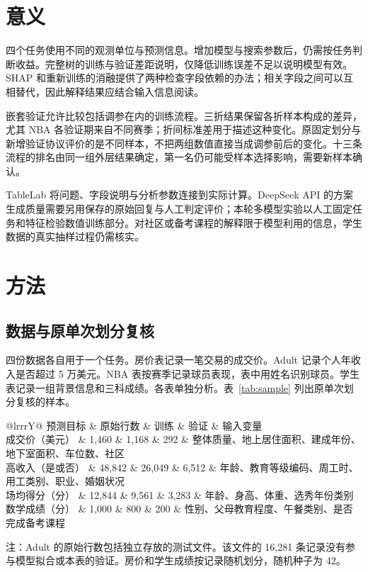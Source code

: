 \documentclass[12pt,journal,onecolumn,a4paper]{IEEEtran}
\newcommand{\tabnote}[1]{\par\vspace{2pt}\begin{minipage}{\linewidth}\footnotesize #1\end{minipage}}
\newcommand{\inlinetab}[1]{\par\smallskip\noindent\begin{minipage}{\linewidth}\centering\small #1\end{minipage}\par\smallskip}
\begin{document}
\section{意义}
四个任务使用不同的观测单位与预测信息。增加模型与搜索参数后，仍需按任务判断收益。完整树的训练与验证差距说明，仅降低训练误差不足以说明模型有效。SHAP 和重新训练的消融提供了两种检查字段依赖的办法；相关字段之间可以互相替代，因此解释结果应结合输入信息阅读。

嵌套验证允许比较包括调参在内的训练流程。三折结果保留各折样本构成的差异，尤其 NBA 各验证期来自不同赛季；折间标准差用于描述这种变化。原固定划分与新增验证协议评价的是不同样本，不把两组数值直接当成调参前后的变化。十三条流程的排名由同一组外层结果确定，第一名仍可能受样本选择影响，需要新样本确认。

TableLab 将问题、字段说明与分析参数连接到实际计算。DeepSeek API 的方案生成质量需要另用保存的原始回复与人工判定评价；本轮多模型实验以人工固定任务和特征检验数值训练部分。对社区或备考课程的解释限于模型利用的信息，学生数据的真实抽样过程仍需核实。

\section{方法}
\subsection{数据与原单次划分复核}
四份数据各自用于一个任务。房价表记录一笔交易的成交价。Adult 记录个人年收入是否超过 5 万美元。NBA 表按赛季记录球员表现，表中用姓名识别球员。学生表记录一组背景信息和三科成绩。各表单独分析。表~\ref{tab:sample} 列出原单次划分复核的样本。
\inlinetab{\label{tab:sample}
\begin{tabularx}{\linewidth}{@{}lrrrY@{}}\toprule
预测目标 & 原始行数 & 训练 & 验证 & 输入变量\\\midrule
成交价（美元） & 1,460 & 1,168 & 292 & 整体质量、地上居住面积、建成年份、地下室面积、车位数、社区\\
高收入（是或否） & 48,842 & 26,049 & 6,512 & 年龄、教育等级编码、周工时、用工类别、职业、婚姻状况\\
场均得分（分） & 12,844 & 9,561 & 3,283 & 年龄、身高、体重、选秀年份类别\\
数学成绩（分） & 1,000 & 800 & 200 & 性别、父母教育程度、午餐类别、是否完成备考课程\\\bottomrule
\end{tabularx}
\tabnote{注：Adult 的原始行数包括独立存放的测试文件。该文件的 16,281 条记录没有参与模型拟合或本表的验证。房价和学生成绩按记录随机划分，随机种子为 42。}}
\end{document}
